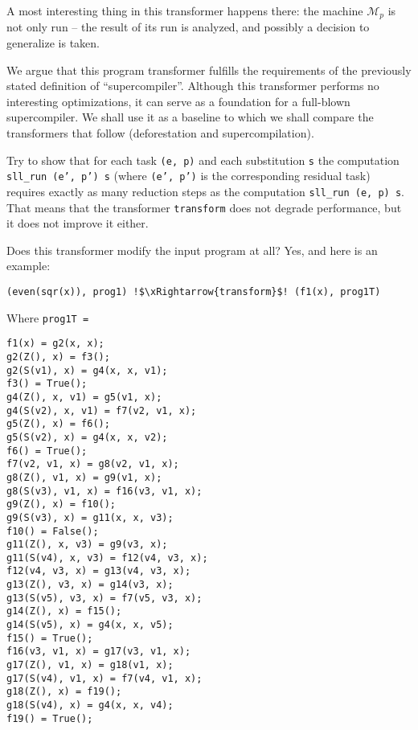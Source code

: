 A most interesting thing in this transformer happens there:
the machine $\mathcal{M}_p$ is not only run -- the result of its run
is analyzed, and possibly a decision to generalize is taken.

We argue that this program transformer fulfills the requirements of the
previously stated definition of ``supercompiler''.
Although this transformer performs no interesting optimizations, it
can serve as a foundation for a full-blown supercompiler.
We shall use it as a baseline to which we shall compare the
transformers that follow (deforestation and supercompilation).

\begin{exercise}
Try to show that for each task \texttt{(e, p)} and each substitution
\texttt{s} the computation \texttt{sll\_run (e', p') s} (where \texttt{(e', p')}
is the corresponding residual task) requires exactly as many reduction steps
as the computation \texttt{sll\_run (e, p) s}. 
That means that the transformer \texttt{transform} does not degrade performance,
but it does not improve it either.
\end{exercise}

Does this transformer modify the input program at all? Yes, and here is an example:
\begin{lstlisting}[language=sll,escapechar=!]
(even(sqr(x)), prog1) !$\xRightarrow{transform}$! (f1(x), prog1T)
\end{lstlisting}
Where \texttt{prog1T =}
\begin{lstlisting}[language=sll]
f1(x) = g2(x, x);
g2(Z(), x) = f3();
g2(S(v1), x) = g4(x, x, v1);
f3() = True();
g4(Z(), x, v1) = g5(v1, x);
g4(S(v2), x, v1) = f7(v2, v1, x);
g5(Z(), x) = f6();
g5(S(v2), x) = g4(x, x, v2);
f6() = True();
f7(v2, v1, x) = g8(v2, v1, x);
g8(Z(), v1, x) = g9(v1, x);
g8(S(v3), v1, x) = f16(v3, v1, x);
g9(Z(), x) = f10();
g9(S(v3), x) = g11(x, x, v3);
f10() = False();
g11(Z(), x, v3) = g9(v3, x);
g11(S(v4), x, v3) = f12(v4, v3, x);
f12(v4, v3, x) = g13(v4, v3, x);
g13(Z(), v3, x) = g14(v3, x);
g13(S(v5), v3, x) = f7(v5, v3, x);
g14(Z(), x) = f15();
g14(S(v5), x) = g4(x, x, v5);
f15() = True();
f16(v3, v1, x) = g17(v3, v1, x);
g17(Z(), v1, x) = g18(v1, x);
g17(S(v4), v1, x) = f7(v4, v1, x);
g18(Z(), x) = f19();
g18(S(v4), x) = g4(x, x, v4);
f19() = True();
\end{lstlisting}

